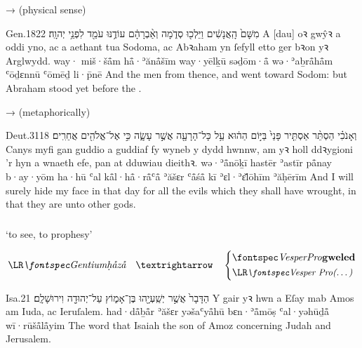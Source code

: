 \begin{frame}{\exwref {} →  (physical sense)}
	\exstep
	\begin{example}{Gen.}{18}{22}{}{}
		\quoling
		{ מִשָּׁם֙ הָֽאֲנָשִׁ֔ים וַיֵּלְכ֖וּ סְדֹ֑מָה וְאַ֨בְרָהָ֔ם עוֹדֶ֥נּוּ עֹמֵ֖ד לִפְנֵ֥י יְהוָֽה׃}
		{A [dau] oꝛ gwŷꝛ a  oddi yno, ac a aethant tua Sodoma, ac Abꝛaham yn ſefyll  etto ger bꝛon yꝛ Arglwydd.}
		{way· miš·šå̄m hå̄·ʾănå̄šīm way·yēlḵū səḏōm·å̄ wə·ʾaḇrå̄hå̄m ʿōḏɛnnū ʿōmēḏ li·p̄nē {\YHWH}}
		{And the men  from thence, and went toward Sodom: but Abraham stood yet before the {\LORD}.}
	\end{example}
\end{frame}


\begin{frame}{\exwref {} →  (metaphorically)}
	\exstep
	\begin{example}{Deut.}{31}{18}{}{}
		\quoling
		{וְאָנֹכִ֗י הַסְתֵּ֨ר אַסְתִּ֤יר פָּנַי֙ בַּיּ֣וֹם הַה֔וּא עַ֥ל כָּל־הָרָעָ֖ה אֲשֶׁ֣ר עָשָׂ֑ה כִּ֣י  אֶל־אֱלֹהִ֖ים אֲחֵרִֽים׃}
		{Canys myfi gan guddio a guddiaf fy wyneb y dydd hwnnw, am yꝛ holl ddꝛygioni ’r hyn a wnaeth efe, pan  at dduwiau dieithꝛ.}
		{wə·ʾå̄nōḵī hastēr ʾastīr på̄nay b·ay·yōm ha·hū ʿal kå̄l·hå̄·rå̄ʿå̄ ʾăšɛr ʿå̄śå̄ kī  ʾɛl·ʾɛ̆lōhīm ʾăḥērīm}
		{And I will surely hide my face in that day for all the evils which they shall have wrought, in that they are  unto other gods.}
	\end{example}
\end{frame}



\subsubsection{}

\begin{frame}{ ‘to see, to prophesy’}
	\begin{center}
		$$
		\mtext{\bh{ḥåzå}} \transto
		\begin{dcases}
			\C{\hl{gweled}}\\
			\mtext{\small\C{(…)}}
		\end{dcases}
		$$
	\end{center}
\end{frame}


\begin{frame}{\ex {}}
	\begin{example}{Isa.}{2}{1}{}{}
		\quoling
		{הַדָּבָר֙ אֲשֶׁ֣ר 	יְשַֽׁעְיָ֖הוּ בֶּן־אָמ֑וֹץ עַל־יְהוּדָ֖ה וִירוּשָׁלִָֽם׃}
		{Y gair yꝛ hwn a  Eſay mab Amos am Iuda, ac Ieruſalem.}
		{had·då̄ḇå̄r ʾăšɛr  yəšaʿyå̄hū bɛn·ʾå̄mōṣ ʿal·yəhūḏå̄ wī·rūšå̄lå̄yim}
		{The word that Isaiah the son of Amoz  concerning Judah and Jerusalem.}
	\end{example}
\end{frame}

